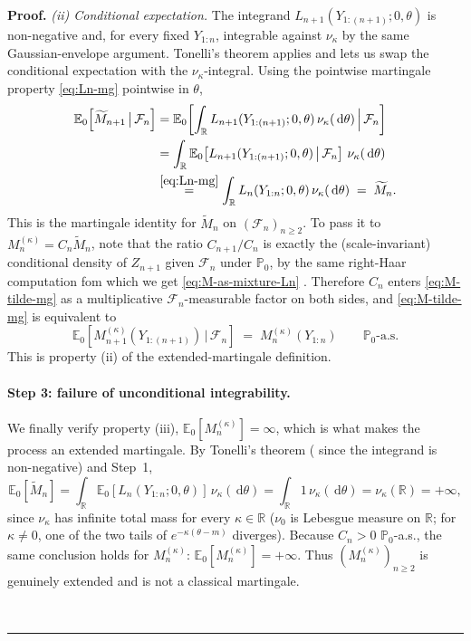 \documentclass{article}%
\newenvironment{proof}[1][Proof]{\noindent\textbf{#1.} }{\ \rule{0.5em}{0.5em}}
\newcommand{\dd}{\,\mathrm{d}}
\newcommand{\1}{\mathbf{1}}
\begin{document}
\begin{proof}
\smallskip\noindent\emph{(ii) Conditional expectation.}
The integrand $L_{n+1}(Y_{1:(n+1)};0,\theta)$ is non-negative and, for every
fixed $Y_{1:n}$, integrable against $\nu_\kappa$ by the same Gaussian-envelope
argument. Tonelli's theorem applies and lets us swap the conditional
expectation with the $\nu_\kappa$-integral. Using the pointwise martingale
property \eqref{eq:Ln-mg} pointwise in $\theta$,
\begin{align}
   \mathbb{E}_0\!\left[\widetilde M_{n+1}\,\big|\,\mathcal{F}_n\right]
   &= \mathbb{E}_0\!\left[\int_\mathbb{R} L_{n+1}(Y_{1:(n+1)};0,\theta)\,
       \nu_\kappa(\dd\theta)\,\Big|\,\mathcal{F}_n\right]\notag\\
   &= \int_\mathbb{R} \mathbb{E}_0\!\left[L_{n+1}(Y_{1:(n+1)};0,\theta)\,\big|\,
       \mathcal{F}_n\right]\,\nu_\kappa(\dd\theta)\notag\\
   &\overset{\eqref{eq:Ln-mg}}{=} \int_\mathbb{R} L_n(Y_{1:n};0,\theta)\,
       \nu_\kappa(\dd\theta)
   \;=\; \widetilde M_n.
   \label{eq:M-tilde-mg}
\end{align}
This is the martingale identity for $\widetilde M_n$ on
$(\mathcal{F}_n)_{n\geq 2}$. To pass it to $M_n^{(\kappa)} = C_n\widetilde M_n$,
note that the ratio $C_{n+1}/C_n$ is exactly the (scale-invariant) conditional
density of $Z_{n+1}$ given $\mathcal{F}_n$ under $\mathbb{P}_0$, by the same right-Haar computation fom which we get \eqref{eq:M-as-mixture-Ln}  \cite[Cor.~4.6]{Wang2025}. Therefore $C_n$ enters
\eqref{eq:M-tilde-mg} as a multiplicative $\mathcal{F}_n$-measurable factor
on both sides, and \eqref{eq:M-tilde-mg} is equivalent to
\begin{equation}\label{eq:Mkappa-mg}
   \mathbb{E}_0\!\left[M_{n+1}^{(\kappa)}(Y_{1:(n+1)})\,\big|\,\mathcal{F}_n\right]
   \;=\; M_n^{(\kappa)}(Y_{1:n})
   \qquad\mathbb{P}_0\text{-a.s.}
\end{equation}
This is property (ii) of the extended-martingale definition.

\paragraph{Step 3: failure of unconditional integrability.}
We finally verify property (iii), $\mathbb{E}_0[M_n^{(\kappa)}] = \infty$, which
is what makes the process an extended martingale. By Tonelli's theorem
( since the integrand is non-negative) and Step~1,
\[
   \mathbb{E}_0\!\left[\widetilde M_n\right]
   = \int_\mathbb{R} \mathbb{E}_0\!\left[L_n(Y_{1:n};0,\theta)\right]\,
       \nu_\kappa(\dd\theta)
   = \int_\mathbb{R} 1\,\nu_\kappa(\dd\theta)
   = \nu_\kappa(\mathbb{R}) = +\infty,
\]
since $\nu_\kappa$ has infinite total mass for every $\kappa\in\mathbb{R}$
($\nu_0$ is Lebesgue measure on $\mathbb{R}$; for $\kappa\neq 0$, one of the
two tails of $e^{-\kappa(\theta-m)}$ diverges). Because $C_n > 0$
$\mathbb{P}_0$-a.s., the same conclusion holds for $M_n^{(\kappa)}$:
$\mathbb{E}_0[M_n^{(\kappa)}] = +\infty$. Thus $(M_n^{(\kappa)})_{n\geq 2}$ is
genuinely extended and is not a classical martingale.


\end{proof}
\end{document}
